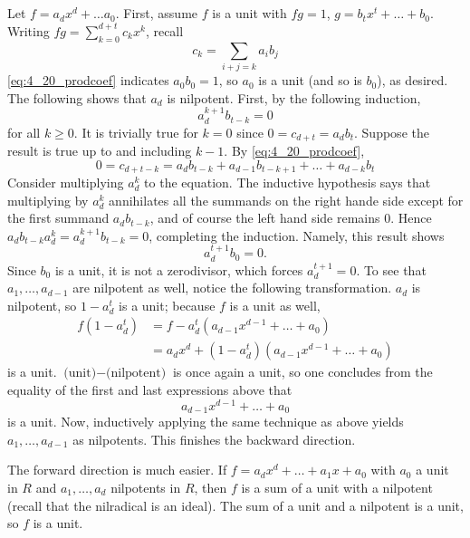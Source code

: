 \documentclass[12pt]{article}
\begin{document}
\subsection{} 
Let $f = a_d x^d + \ldots a_0$. 
First, assume $f$ is a unit with $fg = 1$, $g = b_t x^t + \ldots + b_0$. 
Writing $fg = \sum_{k = 0}^{d + t} c_k x^k$, recall 
\begin{equation} \label{eq:4_20_prodcoef} 
  c_k = \sum_{i + j = k} a_i b_j
\end{equation}
\eqref{eq:4_20_prodcoef} indicates $a_0 b_0 = 1$, so $a_0$ is a unit (and so is $b_0$), as desired. 
The following shows that $a_d$ is nilpotent. 
First, by the following induction, 
$$a_{d}^{k + 1} b_{t - k} = 0$$
for all $k \geq 0$. 
It is trivially true for $k = 0$ since $0 = c_{d + t} = a_d b_t$. 
Suppose the result is true up to and including $k - 1$. 
By \eqref{eq:4_20_prodcoef}, 
$$0 = c_{d + t - k} = a_d b_{t - k} + a_{d - 1}b_{t - k + 1} + \ldots + a_{d - k} b_{t}$$
Consider multiplying $a_{d}^{k}$ to the equation. 
The inductive hypothesis says that multiplying by $a_{d}^{k}$ annihilates all the summands on the right hande side except for the first summand $a_{d} b_{t - k}$, and of course the left hand side remains 0. 
Hence $a_{d} b_{t - k} a_{d}^{k} = a_{d}^{k + 1} b_{t - k} = 0$, completing the induction. 
Namely, this result shows 
$$a_{d}^{t + 1} b_0 = 0.$$
Since $b_0$ is a unit, it is not a zerodivisor, which forces $a_{d}^{t + 1} = 0$. 
To see that $a_1, \ldots, a_{d - 1}$ are nilpotent as well, notice the following transformation. 
$a_d$ is nilpotent, so $1 - a_{d}^{t}$ is a unit; 
because $f$ is a unit as well, 
\begin{align*}
  f(1 - a_d^{t}) & = f - a_{d}^{t}(a_{d - 1}x^{d - 1} + \ldots + a_0) \\ 
					 & = a_{d} x^{d} + (1 - a_d^{t})(a_{d - 1}x^{d - 1} + \ldots + a_0)
\end{align*}
is a unit. 
$\text{(unit)} - \text{(nilpotent)}$ is once again a unit, so one concludes from the equality of the first and last expressions above that
$$a_{d - 1}x^{d - 1} + \ldots + a_0$$ 
is a unit. 
Now, inductively applying the same technique as above yields $a_1, \ldots, a_{d - 1}$ as nilpotents. 
This finishes the backward direction. 

The forward direction is much easier. 
If $f = a_d x^d + \ldots + a_1 x + a_0$ with $a_0$ a unit in $R$ and $a_1, \ldots, a_d$ nilpotents in $R$, then $f$ is a sum of a unit with a nilpotent (recall that the nilradical is an ideal). 
The sum of a unit and a nilpotent is a unit, so $f$ is a unit. 
\end{document}
